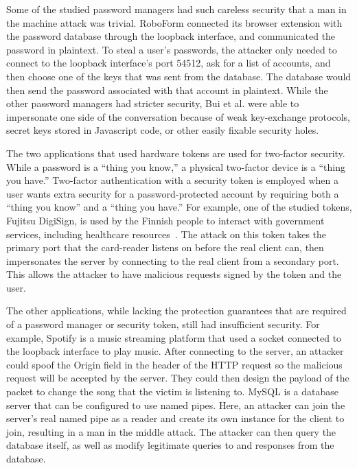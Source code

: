 Some of the studied password managers had such careless security that a man in the machine attack was trivial.  RoboForm connected its browser extension with the password database through the loopback interface, and communicated the password in plaintext.  To steal a user's passwords, the attacker only needed to connect to the loopback interface's port 54512, ask for a list of accounts, and then choose one of the keys that was sent from the database.  The database would then send the password associated with that account in plaintext.  While the other password managers had stricter security, Bui et al. were able to impersonate one side of the conversation because of weak key-exchange protocols, secret keys stored in Javascript code, or other easily fixable security holes.

The two applications that used hardware tokens are used for two-factor security.  While a password is a ``thing you know,'' a physical two-factor device is a ``thing you have.''  Two-factor authentication with a security token is employed when a user wants extra security for a password-protected account by requiring both a ``thing you know'' and a ``thing you have.''  For example, one of the studied tokens, Fujitsu DigiSign, is used by the Finnish people to interact with government services, including healthcare resources~\cite{MitMa}.  The attack on this token takes the primary port that the card-reader listens on before the real client can, then impersonates the server by connecting to the real client from a secondary port.  This allows the attacker to have malicious requests signed by the token and the user.

The other applications, while lacking the protection guarantees that are required of a password manager or security token, still had insufficient security.  For example, Spotify is a music streaming platform that used a socket connected to the loopback interface to play music.  After connecting to the server, an attacker could spoof the Origin field in the header of the HTTP request so the malicious request will be accepted by the server.  They could then design the payload of the packet to change the song that the victim is listening to.  MySQL is a database server that can be configured to use named pipes.  Here, an attacker can join the server's real named pipe as a reader and create its own instance for the client to join, resulting in a man in the middle attack.  The attacker can then query the database itself, as well as modify legitimate queries to and responses from the database.


